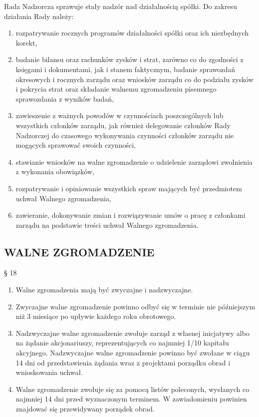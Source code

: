 \documentclass[a4paper, 11pt]{article}
\begin{document}
Rada Nadzorcza sprawuje stały nadzór nad działalnością spółki. Do zakresu działania Rady należy:
\begin{enumerate}
\item	rozpatrywanie rocznych programów działalności spółki oraz ich niezbędnych korekt,
\item	badanie bilansu oraz rachunków zysków i strat, zarówno co do zgodności z księgami i dokumentami, jak i stanem faktycznym, badanie sprawozdań okresowych i rocznych zarządu oraz wniosków zarządu co do podziału zysków i pokrycia strat oraz składanie walnemu zgromadzeniu pisemnego sprawozdania z wyników badań,
\item	zawieszenie z ważnych powodów w czynnościach poszczególnych lub wszystkich członków zarządu, jak również delegowanie członków Rady Nadzorczej do czasowego wykonywania czynności członków zarządu nie mogących sprawować swoich czynności,
\item	stawianie wniosków na walne zgromadzenie o udzielenie zarządowi zwolnienia z wykonania obowiązków,
\item	rozpatrywanie i opiniowanie wszystkich spraw mających być przedmiotem uchwał Walnego zgromadzenia,
\item	zawieranie, dokonywanie zmian i rozwiązywanie umów o pracę z członkami zarządu na podstawie treści uchwał Walnego zgromadzenia.

\end{enumerate}

\subsection{ WALNE ZGROMADZENIE}

§ 18\\
\begin{enumerate}
\item	Walne zgromadzenia mają być zwyczajne i nadzwyczajne.
\item	Zwyczajne walne zgromadzenie powinno odbyć się w terminie nie późniejszym niż 3 miesiące po upływie każdego roku obrotowego.
\item	Nadzwyczajne walne zgromadzenie zwołuje zarząd z własnej inicjatywy albo na żądanie akcjonariuszy, reprezentujących co najmniej 1/10 kapitału akcyjnego. Nadzwyczajne walne zgromadzenie powinno być zwołane w ciągu 14 dni od przedstawienia żądania wraz z projektami porządku obrad i wnioskowania uchwał.
\item	Walne zgromadzenie zwołuje się za pomocą listów poleconych, wysłanych co najmniej 14 dni przed wyznaczonym terminem. W zawiadomieniu powinien znajdować się przewidywany porządek obrad.
\end{enumerate}
\end{document}
